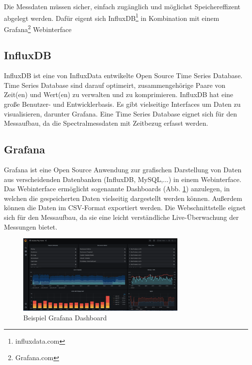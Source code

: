 Die Messdaten müssen sicher, einfach zugänglich und möglichst Speichereffizent abgelegt werden.
Dafür eigent sich InfluxDB\footnote{influxdata.com} in Kombination mit einem Grafana\footnote{Grafana.com} Webinterface
\subsection{InfluxDB}\label{datenbankundinterface}
InfluxDB ist eine von InfluxData entwikelte Open Source Time Series Database. 
Time Series Database  sind darauf optimeirt, zusammengehörige Paare von Zeit(en) und Wert(en) zu verwalten und zu komprimieren.
InfluxDB hat eine große Benutzer- und Entwicklerbasis. Es gibt vielseitige Interfaces um Daten zu visualisieren, darunter Grafana.
Eine Time Series Database eignet sich für den Messaufbau, da die Spectralmessdaten mit Zeitbezug erfasst werden.

\subsection{Grafana}
Grafana ist eine Open Source Anwendung zur grafischen Darstellung von Daten aus verscheidenden Datenbanken (InfluxDB,  MySQL,...) in einem Webinterface.
Das Webinterface ermöglicht sogenannte Dashboards (Abb. \ref{fig:Beispiel_Grafana_Dashboard}) anzulegen, in welchen die gespeicherten Daten vielseitig dargestellt werden können.
Außerdem können die Daten im CSV-Format exportiert werden.
Die Webschnittstelle eignet sich für den Messaufbau, da sie eine leicht verständliche Live-Überwachung der Messungen bietet.
\begin{figure}[ht!]
\centering
\includegraphics[width=0.75\textwidth]{img/Beispiel_Grafana_Dashboard}
\caption{Beispiel Grafana Dashboard}
\label{fig:Beispiel_Grafana_Dashboard}
\end{figure}